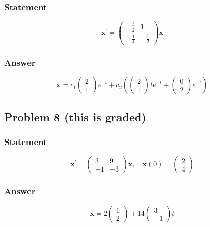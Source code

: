 \documentclass[12pt]{article}
\begin{document}
\subsubsection*{Statement}
\label{sec:org3c9cc27}
    \begin{equation*}
\mathbf{x}^{\prime}=\left(\begin{array}{rr}
-\frac{3}{2} & 1 \\
-\frac{1}{4} & -\frac{1}{2}
\end{array}\right) \mathbf{x}
\end{equation*}
\subsubsection*{Answer}
\label{sec:orgbbc0841}
    \begin{equation*}
\mathbf{x}=c_{1}\left(\begin{array}{l}
2 \\
1
\end{array}\right) e^{-t}+c_{2}\left(\left(\begin{array}{l}
2 \\
1
\end{array}\right) t e^{-t}+\left(\begin{array}{l}
0 \\
2
\end{array}\right) e^{-t}\right)
\end{equation*}
\subsection*{Problem 8 (this is graded)}
\label{sec:orgc904d2e}
\subsubsection*{Statement}
\label{sec:org36a043d}
    \begin{equation*}
\mathbf{x}^{\prime}=\left(\begin{array}{rr}
3 & 9 \\
-1 & -3
\end{array}\right) \mathbf{x}, \quad \mathbf{x}(0)=\left(\begin{array}{l}
2 \\
4
\end{array}\right)
\end{equation*}
\subsubsection*{Answer}
\label{sec:orgc9fc5c5}
    \begin{equation*}
\mathbf{x}=2\left(\begin{array}{l}
1 \\
2
\end{array}\right)+14\left(\begin{array}{r}
3 \\
-1
\end{array}\right) t
\end{equation*}
\end{document}
